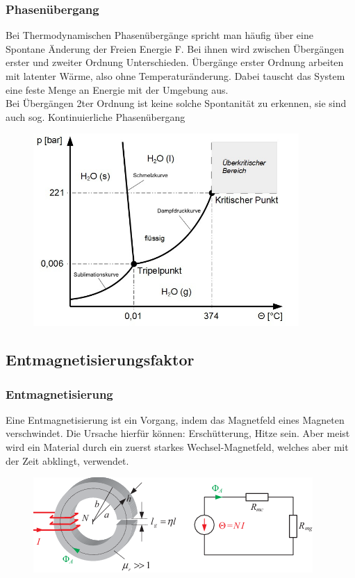         \subsubsection*{Phasenübergang}
            Bei Thermodynamischen Phasenübergänge spricht man häufig über eine Spontane Änderung der Freien Energie F.
            Bei ihnen wird zwischen Übergängen erster und zweiter Ordnung Unterschieden. Übergänge erster Ordnung
            arbeiten mit latenter Wärme, also ohne Temperaturänderung. Dabei tauscht das System eine feste Menge an Energie
            mit der Umgebung aus.\\
            Bei Übergängen 2ter Ordnung ist keine solche Spontanität zu erkennen, sie sind auch sog. Kontinuierliche Phasenübergang
            \begin{figure}[H]
                \centering
                \includegraphics[width=0.9\textwidth]{Images/waterphase.jpg}
            \end{figure}
    \subsection{Entmagnetisierungsfaktor}

        \subsubsection*{Entmagnetisierung}
            Eine Entmagnetisierung ist ein Vorgang, indem das Magnetfeld eines Magneten verschwindet.
            Die Ursache hierfür können: Erschütterung, Hitze sein. Aber meist wird ein Material
            durch ein zuerst starkes Wechsel-Magnetfeld, welches aber mit der Zeit abklingt, verwendet.
            \begin{figure}[H]
                \centering
                \includegraphics{images/Ringkern}
            \end{figure}
